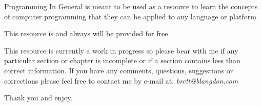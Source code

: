Programming In General is meant to be used as a resource to learn the concepts of computer programming that they can be applied to any
language or platform.
\par

This resource is and always will be provided for free.
\par

This resource is currently a work in progress so please bear with me if any particular section or chapter is incomplete or
if a section contains less than correct information.
If you have any comments, questions, suggestions or corrections please feel free to contact me by e-mail at: \emph{brett@blangdon.com}
\\
\par
Thank you and enjoy.

